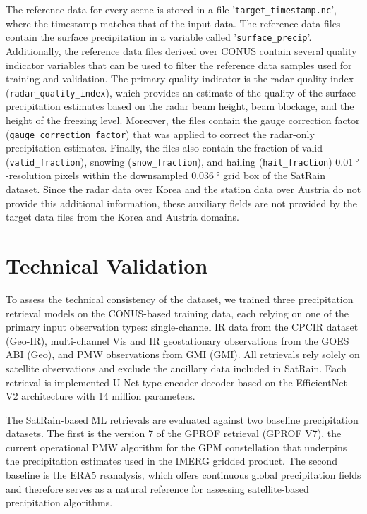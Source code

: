 \documentclass[11pt]{article}
\begin{document}
The reference data for every scene is stored in a file
'\texttt{target\_\textlangle timestamp\textrangle.nc}', where the timestamp
matches that of the input data. The reference data files contain the surface
precipitation in a variable called '\texttt{surface\_precip}'. Additionally, the
reference data files derived over CONUS contain several quality indicator
variables that can be used to filter the reference data samples used for
training and validation. The primary quality indicator is the radar quality
index (\texttt{radar\_quality\_index}), which provides an estimate of the
quality of the surface precipitation estimates based on the radar beam height,
beam blockage, and the height of the freezing level. Moreover, the files contain
the gauge correction factor (\texttt{gauge\_correction\_factor}) that was
applied to correct the radar-only precipitation estimates. Finally, the files
also contain the fraction of valid (\texttt{valid\_fraction}), snowing
(\texttt{snow\_fraction}), and hailing (\texttt{hail\_fraction})
$\SI{0.01}{\degree}$-resolution pixels within the downsampled $\SI{0.036}{\degree}$ grid box of
the SatRain dataset. Since the radar data over Korea and the station data over
Austria do not provide this additional information, these auxiliary fields are
not provided by the target data files from the Korea and Austria domains.


\section{Technical Validation}

To assess the technical consistency of the dataset, we trained three
precipitation retrieval models on the CONUS-based training data, each relying on
one of the primary input observation types: single-channel IR data from the
CPCIR dataset (Geo-IR), multi-channel Vis and IR geostationary observations from
the GOES ABI (Geo), and PMW observations from GMI (GMI). All retrievals rely
solely on satellite observations and exclude the ancillary data included in
SatRain. Each retrieval is implemented U-Net-type encoder-decoder based on the
EfficientNet-V2 architecture \citep{tan2021efficientnetv2} with 14 million
parameters.

The SatRain-based ML retrievals are evaluated against two baseline precipitation
datasets. The first is the version 7 of the GPROF retrieval (GPROF V7), the
current operational PMW algorithm for the GPM constellation that underpins the
precipitation estimates used in the IMERG gridded product. The second baseline
is the ERA5 reanalysis, which offers continuous global precipitation fields and
therefore serves as a natural reference for assessing satellite-based
precipitation algorithms.
\end{document}
